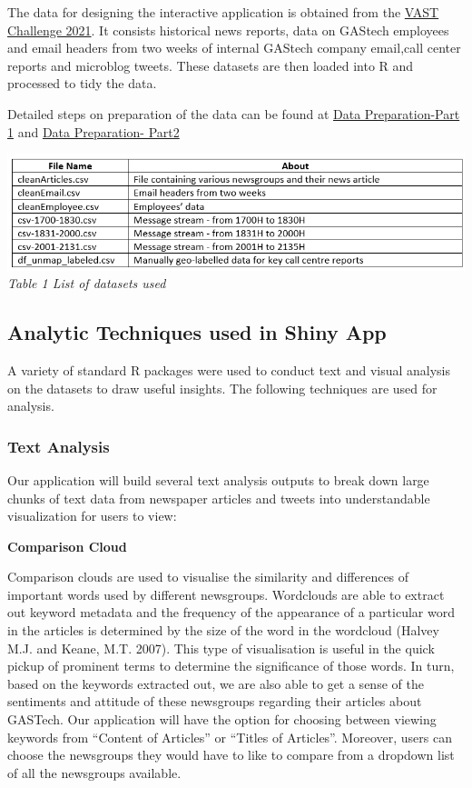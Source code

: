 \documentclass{acm_proc_article-sp}
\begin{document}
The data for designing the interactive application is obtained from the
\href{https://vast-challenge.github.io/2021/index.html}{VAST Challenge
2021}. It consists historical news reports, data on GAStech employees
and email headers from two weeks of internal GAStech company email,call
center reports and microblog tweets. These datasets are then loaded into
R and processed to tidy the data.

Detailed steps on preparation of the data can be found at
\href{https://vast-challenge.netlify.app/data_preparation.html}{Data
Preparation-Part 1} and
\href{https://isss608-kytan-vast2021.netlify.app/posts/2021-07-07-mc3/\#preparation}{Data
Preparation- Part2}

\includegraphics{img/table01.png} \emph{Table 1 List of datasets used}

\hypertarget{analytic-techniques-used-in-shiny-app}{%
\subsection{Analytic Techniques used in Shiny
App}\label{analytic-techniques-used-in-shiny-app}}

A variety of standard R packages were used to conduct text and visual
analysis on the datasets to draw useful insights. The following
techniques are used for analysis.

\hypertarget{text-analysis}{%
\subsubsection{Text Analysis}\label{text-analysis}}

Our application will build several text analysis outputs to break down
large chunks of text data from newspaper articles and tweets into
understandable visualization for users to view:

\textbf{Comparison Cloud}

Comparison clouds are used to visualise the similarity and differences
of important words used by different newsgroups. Wordclouds are able to
extract out keyword metadata and the frequency of the appearance of a
particular word in the articles is determined by the size of the word in
the wordcloud (Halvey M.J. and Keane, M.T. 2007). This type of
visualisation is useful in the quick pickup of prominent terms to
determine the significance of those words. In turn, based on the
keywords extracted out, we are also able to get a sense of the
sentiments and attitude of these newsgroups regarding their articles
about GASTech. Our application will have the option for choosing between
viewing keywords from ``Content of Articles'' or ``Titles of Articles''.
Moreover, users can choose the newsgroups they would have to like to
compare from a dropdown list of all the newsgroups available.
\end{document}
